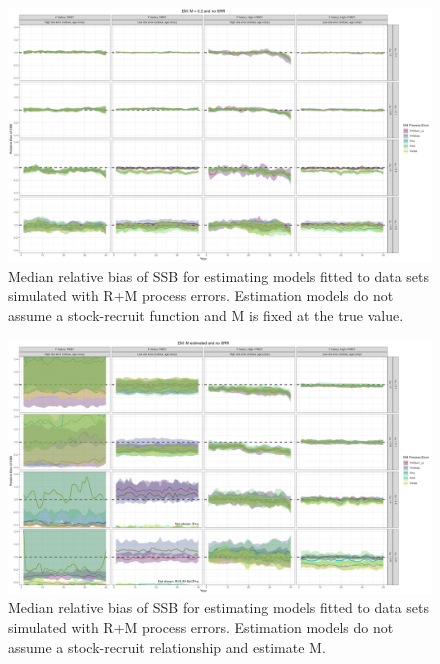 \documentclass[
  12pt,
]{article}
\begin{document}
\begin{landscape}
\begin{figure}
\caption{Median relative bias of SSB for estimating models fitted to data sets simulated with R+M process errors.  Estimation models do not assume a stock-recruit function and M is fixed at the true value.}\label{M_om_em_R_MF_relbias_ssb}
\begin{center}
\includegraphics[width = \textwidth]{M_om_R_MF_relbias_ssb.png}
\end{center}
\end{figure}
\end{landscape}

\begin{landscape}
\begin{figure}
\caption{Median relative bias of SSB for estimating models fitted to data sets simulated with R+M process errors. Estimation models do not assume a stock-recruit relationship and estimate M.}\label{M_om_em_R_ME_relbias_ssb}
\begin{center}
\includegraphics[width = \textwidth]{M_om_R_ME_relbias_ssb.png}
\end{center}
\end{figure}
\end{landscape}
\end{document}
